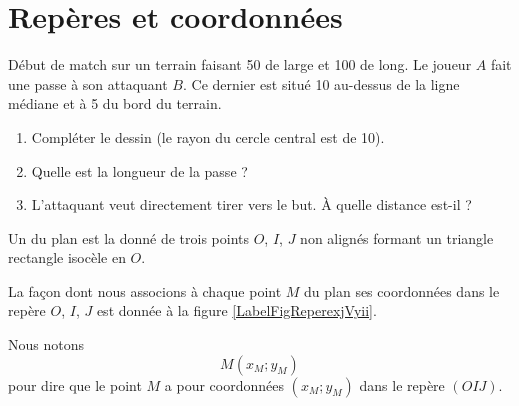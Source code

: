 
\section{Repères et coordonnées}


\begin{Aprojeter}

Début de match sur un terrain faisant \unit{50}{\meter} de large et \unit{100}{\meter} de long. Le joueur \( A\) fait une passe à son attaquant \( B\). Ce dernier est situé \unit{10}{\meter} au-dessus de la ligne médiane et à \unit{5}{\meter} du bord du terrain.

\begin{center}
   
\end{center}

\begin{enumerate}
    \item
        Compléter le dessin (le rayon du cercle central est de \unit{10}{\meter}).
    \item
        Quelle est la longueur de la passe ?
    \item
        L'attaquant veut directement tirer vers le but. À quelle distance est-il ?
\end{enumerate}
    
\end{Aprojeter}


\begin{definition}
    Un  du plan est la donné de trois points \( O\), \( I\), \( J\) non alignés formant un triangle rectangle isocèle en  \( O\).
\end{definition}


La façon dont nous associons à chaque point \( M\) du plan ses coordonnées dans le repère \( O\), \( I\), \( J\) est donnée à la figure \ref{LabelFigReperexjVyii}.
\newcommand{\CaptionFigReperexjVyii}{Lire les coordonnées du point \( M\) dans le repère \( OIJ\).}


Nous notons 
\begin{equation}
    M(x_M;y_M)
\end{equation}
pour dire que le point \( M\) a pour coordonnées \( (x_M;y_M)\) dans le repère \( (OIJ)\).

